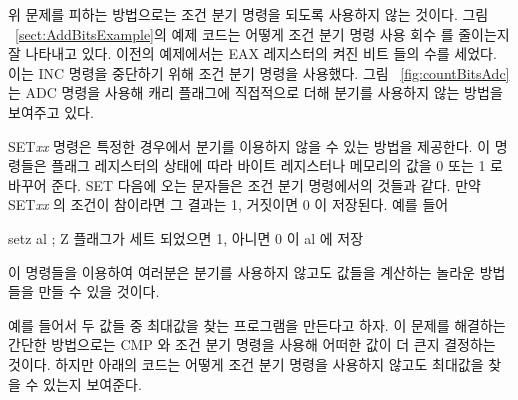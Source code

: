 
위 문제를 피하는 방법으로는 조건 분기 명령을 되도록 사용하지 않는 것이다.
그림 ~\ref{sect:AddBitsExample}의 예제 코드는 어떻게 조건 분기 명령 사용 회수
를 줄이는지 잘 나타내고 있다. 이전의 예제에서는 EAX 레지스터의 켜진 비트
들의 수를 세었다. 이는 {\code INC} 명령을 중단하기 위해 조건 분기 명령을 
사용했다. 그림 ~\ref{fig:countBitsAdc} 는 {\code ADC} 명령을 사용해
캐리 플래그에 직접적으로 더해 분기를 사용하지 않는 방법을 보여주고 있다. 

{\code SET\emph{xx}} 명령은 특정한 경우에서 분기를 
이용하지 않을 수 있는 방법을 제공한다. 이 명령들은 플래그 레지스터의 상태에 따라 
바이트 레지스터나 메모리의 값을 0 또는 1 로 바꾸어 준다. {\code SET} 다음에
오는 문자들은 조건 분기 명령에서의 것들과 같다. 만약 {\code SET\emph{xx}}
의 조건이 참이라면 그 결과는 1, 거짓이면 0 이 저장된다. 예를 들어 

\begin{AsmCodeListing}[frame=none,numbers=none]
      setz   al        ; Z 플래그가 세트 되었으면 1, 아니면 0 이 al 에 저장
\end{AsmCodeListing}
이 명령들을 이용하여 여러분은 분기를 사용하지 않고도 값들을 계산하는 놀라운
방법들을 만들 수 있을 것이다. 

예를 들어서 두 값들 중 최대값을 찾는 프로그램을 만든다고 하자. 이 문제를
해결하는 간단한 방법으로는 {\code CMP} 와 조건 분기 명령을 사용해 어떠한
값이 더 큰지 결정하는 것이다. 하지만 아래의 코드는 어떻게 조건 분기 명령을
사용하지 않고도 최대값을 찾을 수 있는지 보여준다. 

